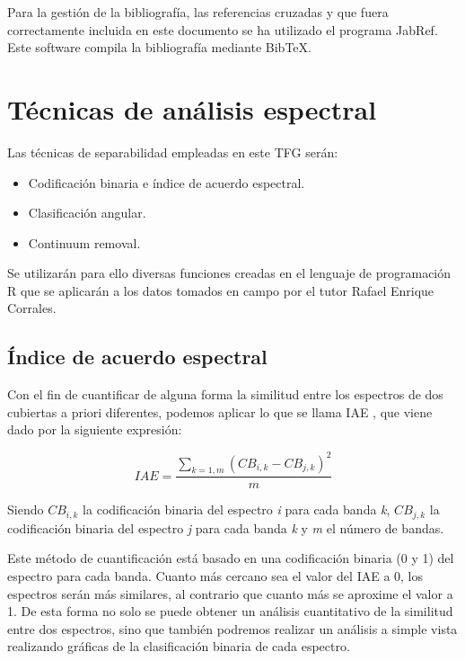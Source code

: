 Para la gestión de la bibliografía, las referencias cruzadas y que fuera correctamente incluida en este documento se ha utilizado el programa JabRef. Este software compila la  bibliografía mediante BibTeX.

\section{Técnicas de análisis espectral}
\label{sec:tecnicas}

Las técnicas de separabilidad empleadas en este \ac{TFG} serán:
\begin{itemize}
	\item Codificación binaria e índice de acuerdo espectral.
	\item Clasificación angular.
	\item Continuum removal.
\end{itemize}

Se utilizarán para ello diversas funciones creadas en el lenguaje de programación R que se aplicarán a los datos tomados en campo por el tutor Rafael Enrique Corrales.

\subsection{Índice de acuerdo espectral}
Con el fin de cuantificar de alguna forma la similitud entre los espectros de dos cubiertas a priori diferentes, podemos aplicar lo que se llama \ac{IAE} \citep{chuvieco2002teledeteccion}, que viene dado por la siguiente expresión:

\begin{equation} \label{eq:IAE}
	IAE = \frac{\sum_{k=1,m}(CB_{i,k} - CB_{j,k})^{2}}{m}
\end{equation}

Siendo $CB_{i,k}$ la codificación binaria del espectro \textit{i} para cada banda \textit{k}, $CB_{j,k}$ la codificación binaria del espectro \textit{j} para cada banda \textit{k} y \textit{m} el número de bandas.\Sep

Este método de cuantificación está basado en una codificación binaria (0 y 1) del espectro para cada banda. Cuanto más cercano sea el valor del \ac{IAE} a 0, los espectros serán más similares, al contrario que cuanto más se aproxime el valor a 1. De esta forma no solo se puede obtener un análisis cuantitativo de la similitud entre dos espectros, sino que también podremos realizar un análisis a simple vista realizando gráficas de la clasificación binaria de cada espectro.\Sep

